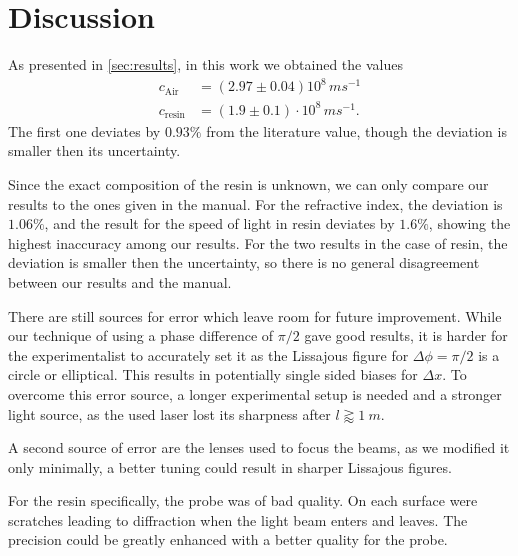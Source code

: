 \section{Discussion}
\label{sec:discussion}
As presented in \autoref{sec:results}, in this work we obtained the values
\begin{align}
  c_\text{Air} &= (2.97 \pm 0.04) 10^8 \, \si{ms^{-1}} \\
  c_\text{resin} &= (1.9 \pm 0.1) \cdot 10^8 \, \si{ms^{-1}}.
\end{align}
The first one deviates by $0.93 \%$ from the literature value, though the deviation is smaller then
its uncertainty.

Since the exact composition of the resin is unknown, we can only compare our results to the ones
given in the manual. For the refractive index, the deviation is $1.06 \%$, and the result for the
speed of light in resin deviates by $1.6 \%$, showing the highest inaccuracy among our results. For
the two results in the case of resin, the deviation is smaller then the uncertainty, so there is no
general disagreement between our results and the manual.

There are still sources for error which leave room for future improvement. While our technique of
using a phase difference of $\pi/2$ gave good results, it is harder for the experimentalist to
accurately set it as the Lissajous figure for $\Delta \phi = \pi/2$ is a circle or elliptical. This
results in potentially single sided biases for $\Delta x$. To overcome this error source, a longer
experimental setup is needed and a stronger light source, as the used laser lost its sharpness after
$l \gtrapprox \SI{1}{m}$.

A second source of error are the lenses used to focus the beams, as we modified it only minimally, a
better tuning could result in sharper Lissajous figures.

For the resin specifically, the probe was of bad quality. On each surface were scratches leading to
diffraction when the light beam enters and leaves. The precision could be greatly enhanced with a
better quality for the probe.

